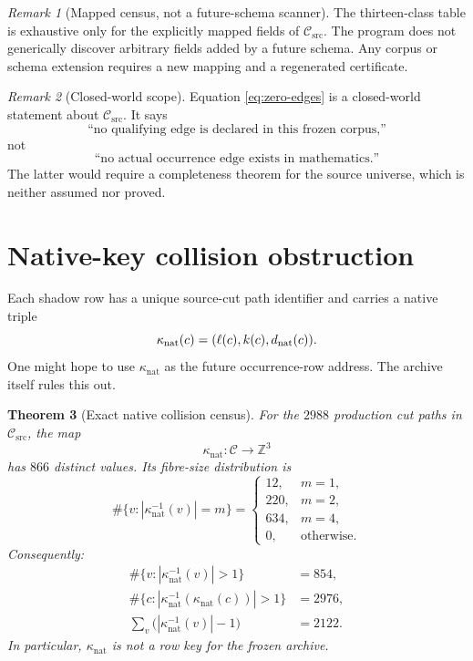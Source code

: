 \documentclass[11pt]{article}
\newtheorem{theorem}{Theorem}[section]
\theoremstyle{definition}
\theoremstyle{remark}
\newtheorem{remark}[theorem]{Remark}
\newcommand{\Csrc}{\mathcal C_{\mathrm{src}}}
\newcommand{\Nkey}{\kappa_{\mathrm{nat}}}
\begin{document}
\begin{remark}[Mapped census, not a future-schema scanner]
The thirteen-class table is exhaustive only for the explicitly mapped
fields of \(\Csrc\).  The program does not generically discover
arbitrary fields added by a future schema.  Any corpus or schema
extension requires a new mapping and a regenerated certificate.
\end{remark}

\begin{remark}[Closed-world scope]\label{rem:closed}
Equation \eqref{eq:zero-edges} is a closed-world statement about
\(\Csrc\).  It says
\[
 \text{``no qualifying edge is declared in this frozen corpus,''}
\]
not
\[
 \text{``no actual occurrence edge exists in mathematics.''}
\]
The latter would require a completeness theorem for the source
universe, which is neither assumed nor proved.
\end{remark}

\section{Native-key collision obstruction}

Each shadow row has a unique source-cut path identifier and carries a
native triple
\[
 \Nkey(c)=(\ell(c),k(c),d_{\rm nat}(c)).
\]
One might hope to use \(\Nkey\) as the future occurrence-row address.
The archive itself rules this out.

\begin{theorem}[Exact native collision census]\label{thm:collision}
For the \(2988\) production cut paths in \(\Csrc\), the map
\[
 \Nkey:\mathcal C\longrightarrow\mathbb Z^3
 \tag{4.1}\label{eq:native-key}
\]
has \(866\) distinct values.  Its fibre-size distribution is
\[
 \#\{v:|\Nkey^{-1}(v)|=m\}
 =
 \begin{cases}
 12,&m=1,\\
 220,&m=2,\\
 634,&m=4,\\
 0,&\text{otherwise}.
 \end{cases}
 \tag{4.2}\label{eq:distribution}
\]
Consequently:
\[
\begin{aligned}
 \#\{v:|\Nkey^{-1}(v)|>1\}&=854,\\
 \#\{c:|\Nkey^{-1}(\Nkey(c))|>1\}&=2976,\\
 \sum_v\bigl(|\Nkey^{-1}(v)|-1\bigr)&=2122.
\end{aligned}
\tag{4.3}\label{eq:collision-counts}
\]
In particular, \(\Nkey\) is not a row key for the frozen archive.
\end{theorem}
\end{document}
